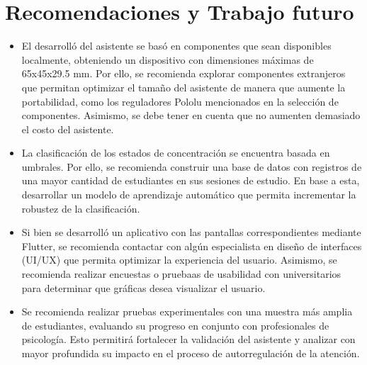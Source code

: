 \section{Recomendaciones y Trabajo futuro}
\begin{itemize}
    \item El desarrolló del asistente se basó en componentes que sean disponibles localmente, obteniendo un dispositivo con dimensiones máximas de 65x45x29.5 mm. Por ello, se recomienda explorar componentes extranjeros que permitan optimizar el tamaño del asistente de manera que aumente la portabilidad, como los reguladores Pololu mencionados en la selección de componentes. Asimismo, se debe tener en cuenta que no aumenten demasiado el costo del asistente.
    \item La clasificación de los estados de concentración se encuentra basada en umbrales. Por ello, se recomienda construir una base de datos con registros de una mayor cantidad de estudiantes en sus sesiones de estudio. En base a esta, desarrollar un modelo de aprendizaje automático que permita incrementar la robustez de la clasificación.
    \item Si bien se desarrolló un aplicativo con las pantallas correspondientes mediante Flutter, se recomienda contactar con algún especialista en diseño de interfaces (UI/UX) que permita optimizar la experiencia del usuario. Asimismo, se recomienda realizar encuestas o pruebaas de usabilidad con universitarios para determinar que gráficas desea visualizar el usuario.
    \item Se recomienda realizar pruebas experimentales con una muestra más amplia de estudiantes, evaluando su progreso en conjunto con profesionales de psicología. Esto permitirá fortalecer la validación del asistente y analizar con mayor profundida su impacto en el proceso de autorregulación de la atención.
\end{itemize}


